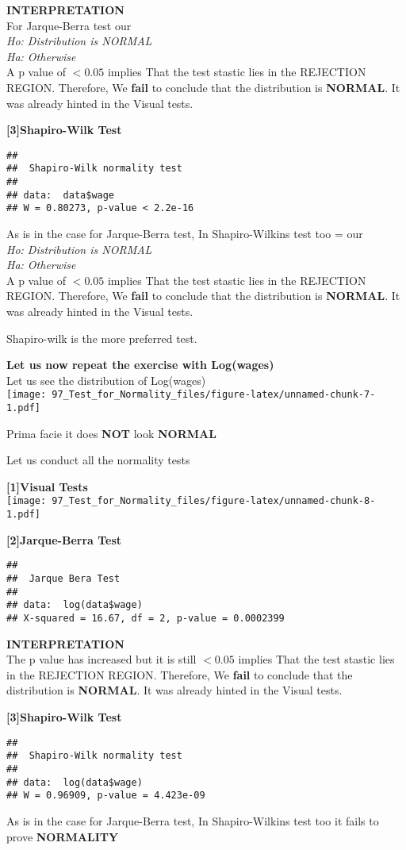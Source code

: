 \documentclass[
]{article}
\begin{document}
\textbf{INTERPRETATION}\\
For Jarque-Berra test our\\
\emph{Ho: Distribution is NORMAL}\\
\emph{Ha: Otherwise}\\
A p value of \(<0.05\) implies That the test stastic lies in the
{REJECTION REGION}. Therefore, We \textbf{fail} to conclude that the
distribution is \textbf{NORMAL}. It was already hinted in the Visual
tests.

\textbf{{[}3{]}Shapiro-Wilk Test}

\begin{verbatim}
## 
##  Shapiro-Wilk normality test
## 
## data:  data$wage
## W = 0.80273, p-value < 2.2e-16
\end{verbatim}

As is in the case for Jarque-Berra test, In Shapiro-Wilkins test too =
our\\
\emph{Ho: Distribution is NORMAL}\\
\emph{Ha: Otherwise}\\
A p value of \(<0.05\) implies That the test stastic lies in the
{REJECTION REGION}. Therefore, We \textbf{fail} to conclude that the
distribution is \textbf{NORMAL}. It was already hinted in the Visual
tests.

Shapiro-wilk is the more preferred test.

\textbf{Let us now repeat the exercise with Log(wages)}\\
Let us see the distribution of Log(wages)\\
\texttt{[image: 97\_Test\_for\_Normality\_files/figure-latex/unnamed-chunk-7-1.pdf]}

Prima facie it does \textbf{NOT} look \textbf{NORMAL}

Let us conduct all the normality tests

\textbf{{[}1{]}Visual Tests}\\
\texttt{[image: 97\_Test\_for\_Normality\_files/figure-latex/unnamed-chunk-8-1.pdf]}

\textbf{{[}2{]}Jarque-Berra Test}

\begin{verbatim}
## 
##  Jarque Bera Test
## 
## data:  log(data$wage)
## X-squared = 16.67, df = 2, p-value = 0.0002399
\end{verbatim}

\textbf{INTERPRETATION}\\
The p value has increased but it is still \(<0.05\) implies That the
test stastic lies in the {REJECTION REGION}. Therefore, We \textbf{fail}
to conclude that the distribution is \textbf{NORMAL}. It was already
hinted in the Visual tests.

\textbf{{[}3{]}Shapiro-Wilk Test}

\begin{verbatim}
## 
##  Shapiro-Wilk normality test
## 
## data:  log(data$wage)
## W = 0.96909, p-value = 4.423e-09
\end{verbatim}

As is in the case for Jarque-Berra test, In Shapiro-Wilkins test too it
fails to prove \textbf{NORMALITY}
\end{document}
